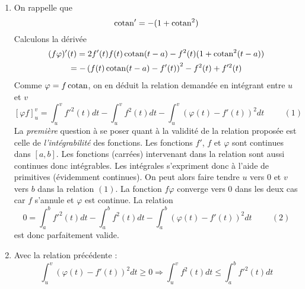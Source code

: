 \begin{enumerate}
\item On rappelle que 
\begin{displaymath}
 {\operatorname{cotan}}' = -(1+{\operatorname{cotan}} ^2)
\end{displaymath}
Calculons la dérivée
\begin{multline*}
 (f\varphi)'(t)
=2f'(t)f(t)\operatorname{cotan} (t-a) -f^2(t)(1+{\operatorname{cotan}}^2(t-a))\\
=-\left(f(t)\operatorname{cotan} (t-a) -f'(t) \right)^2 -f^2(t) + f'^2(t)
\end{multline*}
Comme $\varphi=f\operatorname{cotan}$, on en déduit la relation demandée en intégrant entre $u$ et $v$
\begin{displaymath}
 \left[ \varphi f\right]_{u}^{v}
= \int_u^vf'^2(t)dt - \int_u^vf^2(t)dt  - \int_u^v\left( \varphi(t) - f'(t)\right)^2dt  \hspace{1cm}(1)
\end{displaymath}
La \emph{première} question à se poser quant à la validité de la relation proposée est celle de \emph{l'intégrabilité} des fonctions.\newline
Les fonctions $f'$, $f$ et $\varphi$ sont continues dans $[a,b]$. Les fonctions (carrées) intervenant dans la relation sont  aussi continues donc intégrables. Les intégrales s'expriment donc à l'aide de primitives (évidemment continues). On peut alors faire tendre $u$ vers $0$ et $v$ vers $b$ dans la relation $(1)$. La fonction $f\varphi$ converge vers $0$ dans les deux cas car $f$ s'annule et $\varphi$ est continue.\newline
La relation
\begin{displaymath}
 0=\int_a^bf'^2(t)dt - \int_a^bf^2(t)dt 
-\int_a^b\left( \varphi(t) - f'(t)\right)^2dt \hspace{1cm}(2)
\end{displaymath}
est donc parfaitement valide.
\item Avec la relation précédente :
\begin{displaymath}
 \int_u^v\left( \varphi(t) - f'(t)\right)^2dt \geq 0
\Rightarrow
\int_u^vf^2(t)dt \leq \int_a^bf'^2(t)dt
\end{displaymath}


\end{enumerate}
